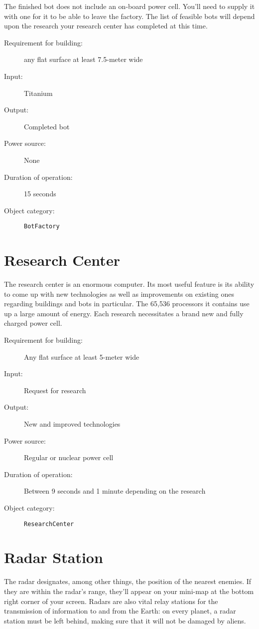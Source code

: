 The finished bot does not include an on-board power cell. You'll need to supply it with one for it to be able to leave the factory. The list of feasible bots will depend upon the research your research center has completed at this time.

\begin{description}
    \item[Requirement for building:] any flat surface at least 7.5-meter wide
    \item[Input:] Titanium
    \item[Output:] Completed bot
    \item[Power source:] None
    \item[Duration of operation:] 15 seconds
    \item[Object category:] \texttt{BotFactory}
\end{description}


\section{Research Center}

The research center is an enormous computer. Its most useful feature is its ability to come up with new technologies as well as improvements on existing ones regarding buildings and bots in particular. The 65,536 processors it contains use up a large amount of energy. Each research necessitates a brand new and fully charged power cell.

\begin{description}
    \item[Requirement for building:] Any flat surface at least 5-meter wide
    \item[Input:] Request for research
    \item[Output:] New and improved technologies
    \item[Power source:] Regular or nuclear power cell
    \item[Duration of operation:] Between 9 seconds and 1 minute depending on the research
    \item[Object category:] \texttt{ResearchCenter}
\end{description}


\section{Radar Station}

The radar designates, among other things, the position of the nearest enemies. If they are within the radar's range, they'll appear on your mini-map at the bottom right corner of your screen. Radars are also vital relay stations for the transmission of information to and from the Earth: on every planet, a radar station must be left behind, making sure that it will not be damaged by aliens. 

